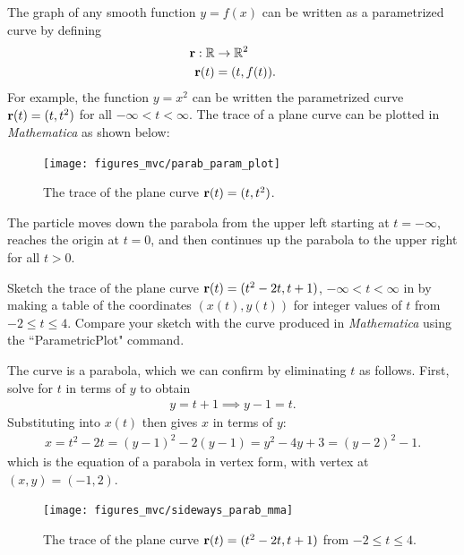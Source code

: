 \documentclass[12pt,letterpaper,reqno]{article}
\numberwithin{equation}{section}
\newcommand{\R}{\ensuremath{\mathbb R}}
\newcommand{\bbr}{{\bf r}}
\begin{document}
{\newpage

\begin{example}
The graph of any smooth function $y=f(x)$ can be written as a parametrized curve by defining
\begin{align*}
	\bbr:\R &\to \R^2 \\
	\bbr(t)&=(t,f(t)).
\end{align*}
For example, the function $y=x^2$ can be written the parametrized curve $\bbr(t)=(t,t^2)$ for all $-\infty < t < \infty$.	The trace of a plane curve can be plotted in \emph{Mathematica} as shown below:

\begin{figure}[h]
	\begin{center}
		\texttt{[image: figures\_mvc/parab\_param\_plot]}
	\end{center}
	\caption{The trace of the plane curve $\bbr(t)=(t,t^2)$.}
\end{figure} 

The particle moves down the parabola from the upper left starting at $t=-\infty$, reaches the origin at $t=0$, and then continues up the parabola to the upper right for all $t>0$.
\end{example}


\begin{exercise}
Sketch the trace of the plane curve $\bbr(t)=(t^2-2t,t+1)$, $-\infty < t < \infty$ in by making a table of the coordinates $(x(t),y(t))$ for integer values of $t$ from $-2 \leq t \leq 4$. Compare your sketch with the curve produced in \emph{Mathematica} using the ``ParametricPlot" command.	
\end{exercise}
{\color{red}
\begin{solution}
	The curve is a parabola, which we can confirm by eliminating $t$ as follows. First, solve for $t$ in terms of $y$ to obtain
\begin{align*}
	y=t+1 \implies y-1=t.
\end{align*}
Substituting into $x(t)$ then gives $x$ in terms of $y$:
\begin{align*}
	x=t^2-2t=(y-1)^2-2(y-1)=y^2-4y+3=(y-2)^2-1.
\end{align*}
which is the equation of a parabola in vertex form, with vertex at $(x,y)=(-1,2)$. 

\begin{figure}[h]
	\begin{center}
		\texttt{[image: figures\_mvc/sideways\_parab\_mma]}
	\end{center}
	\caption{The trace of the plane curve $\bbr(t)=(t^2-2t,t+1)$ from $-2 \leq t \leq 4$.}
\end{figure}


\end{solution}}}
\end{document}
